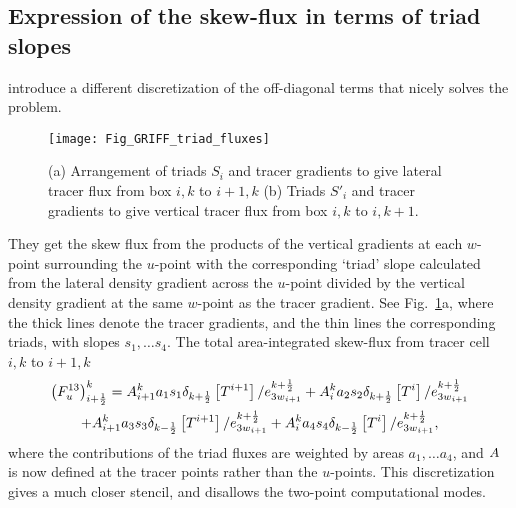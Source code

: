 \documentclass[NEMO_book]{subfiles}
\begin{document}
\subsection{Expression of the skew-flux in terms of triad slopes}
\citep{Griffies_al_JPO98} introduce a different discretization of the
off-diagonal terms that nicely solves the problem.
\begin{figure}[h] \begin{center}
    \texttt{[image: Fig\_GRIFF\_triad\_fluxes]}
    \caption{ \label{fig:triad:ISO_triad}
      (a) Arrangement of triads $S_i$ and tracer gradients to
           give lateral tracer flux from box $i,k$ to $i+1,k$
      (b) Triads $S'_i$ and tracer gradients to give vertical tracer flux from
            box $i,k$ to $i,k+1$.}
 \end{center} \end{figure}
They get the skew flux from the products of the vertical gradients at
each $w$-point surrounding the $u$-point with the corresponding `triad'
slope calculated from the lateral density gradient across the $u$-point
divided by the vertical density gradient at the same $w$-point as the
tracer gradient. See Fig.~\ref{fig:triad:ISO_triad}a, where the thick lines
denote the tracer gradients, and the thin lines the corresponding
triads, with slopes $s_1, \dotsc s_4$. The total area-integrated
skew-flux from tracer cell $i,k$ to $i+1,k$
\begin{multline}
  \label{eq:triad:i13}
  \left( F_u^{13}  \right)_{i+\frac{1}{2}}^k = {A}_{i+1}^k a_1 s_1
  \delta _{k+\frac{1}{2}} \left[ T^{i+1}
  \right]/e_{{3w}_{i+1}}^{k+\frac{1}{2}}  + {A} _i^k a_2 s_2 \delta
  _{k+\frac{1}{2}} \left[ T^i
  \right]/e_{{3w}_{i+1}}^{k+\frac{1}{2}} \\
   +{A} _{i+1}^k a_3 s_3 \delta _{k-\frac{1}{2}} \left[ T^{i+1}
  \right]/e_{{3w}_{i+1}}^{k+\frac{1}{2}}  +{A} _i^k a_4 s_4 \delta
  _{k-\frac{1}{2}} \left[ T^i \right]/e_{{3w}_{i+1}}^{k+\frac{1}{2}},
\end{multline}
where the contributions of the triad fluxes are weighted by areas
$a_1, \dotsc a_4$, and ${A}$ is now defined at the tracer points
rather than the $u$-points. This discretization gives a much closer
stencil, and disallows the two-point computational modes.
\end{document}
